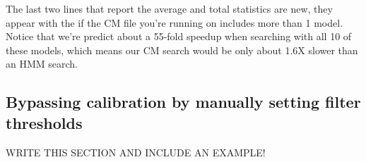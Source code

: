 The last two lines that report the average and total statistics are
new, they appear with the  if the
CM file you're running   on includes more than 1 model. 
Notice that we're predict about a 55-fold speedup when searching with
all 10 of these models, which means our CM search would be only about
1.6X slower than an HMM search.

\subsection{Bypassing calibration by manually setting filter
  thresholds}

WRITE THIS SECTION AND INCLUDE AN EXAMPLE!

